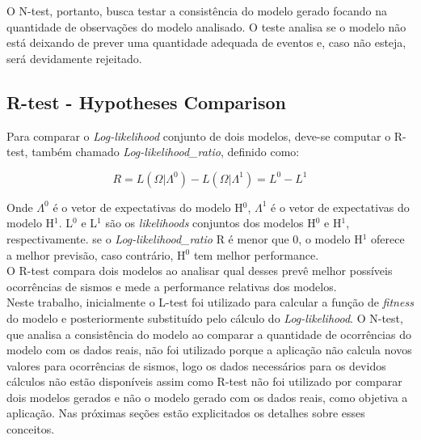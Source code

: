 
O N-test, portanto, busca testar a consistência do modelo gerado focando na quantidade de observações do modelo analisado. O teste analisa se o modelo não está deixando de prever uma quantidade adequada de eventos e, caso não esteja, será devidamente rejeitado.
\subsection{R-test - Hypotheses Comparison}
Para comparar o {\it Log-likelihood} conjunto de dois modelos, deve-se computar o R-test, também chamado {\it Log-likelihood\_ratio}, definido como:

\begin{equation}
	R = L(\Omega|\Lambda^0) - L(\Omega|\Lambda^1) = L^0 - L^1
\end{equation}


Onde $\Lambda^0$ é o vetor de expectativas do modelo H$^0$, $\Lambda^1$ é o vetor de expectativas do modelo H$^1$. L$^0$ e L$^1$ são os {\it likelihoods} conjuntos dos modelos H$^0$ e H$^1$, respectivamente. se o {\it Log-likelihood\_ratio} R é menor que 0, o modelo H$^1$ oferece a melhor previsão, caso contrário, H$^0$ tem melhor performance.\\

O R-test compara dois modelos ao analisar qual desses prevê melhor possíveis ocorrências de sismos e mede a performance relativas dos modelos.\\ %

Neste trabalho, inicialmente o L-test foi utilizado para calcular a função de {\it fitness} do modelo e posteriormente substituído pelo cálculo do {\it Log-likelihood}. O N-test, que analisa a consistência do modelo ao comparar a quantidade de ocorrências do modelo com os dados reais, não foi utilizado porque a aplicação não calcula novos valores para ocorrências de sismos, logo os dados necessários para os devidos cálculos não estão disponíveis assim como R-test não foi utilizado por comparar dois modelos gerados e não o modelo gerado com os dados reais, como objetiva a aplicação. Nas próximas seções estão explicitados os detalhes sobre esses conceitos.